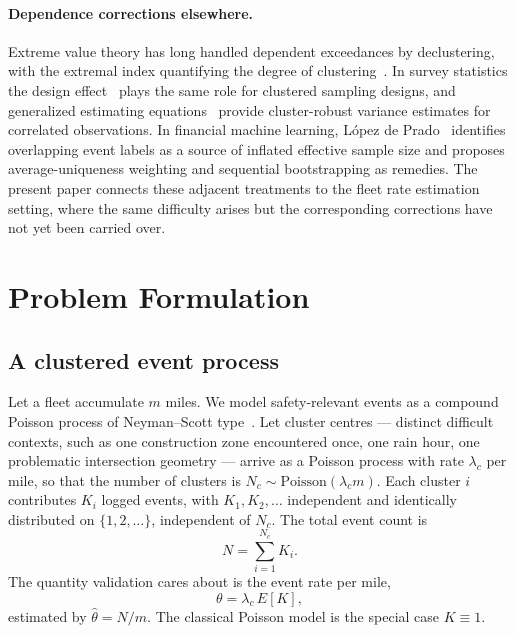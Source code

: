 \documentclass[11pt]{article}
\begin{document}
\paragraph{Dependence corrections elsewhere.} Extreme value theory has long handled
dependent exceedances by declustering, with the extremal index quantifying the
degree of clustering~\cite{ferro2003inference}. In survey statistics the design
effect~\cite{kish1965survey,cochran1977sampling} plays the same role for clustered
sampling designs, and generalized estimating
equations~\cite{liang1986longitudinal} provide cluster-robust variance estimates
for correlated observations. In financial machine learning, López de
Prado~\cite{lopezdeprado2018advances} identifies overlapping event labels as a
source of inflated effective sample size and proposes average-uniqueness weighting
and sequential bootstrapping as remedies. The present paper connects these adjacent
treatments to the fleet rate estimation setting, where the same difficulty arises
but the corresponding corrections have not yet been carried over.

\section{Problem Formulation}
\label{sec:formulation}

\subsection{A clustered event process}

Let a fleet accumulate $m$ miles. We model safety-relevant events as a compound
Poisson process of Neyman--Scott type~\cite{neyman1958statistical}. Let cluster
centres --- distinct difficult contexts, such as one construction zone encountered
once, one rain hour, one problematic intersection geometry --- arrive as a Poisson
process with rate $\lambda_c$ per mile, so that the number of clusters is
$N_c \sim \mathrm{Poisson}(\lambda_c m)$. Each cluster $i$ contributes $K_i$
logged events, with $K_1, K_2, \dots$ independent and identically distributed on
$\{1, 2, \dots\}$, independent of $N_c$. The total event count is
\begin{equation}
N = \sum_{i=1}^{N_c} K_i .
\end{equation}
The quantity validation cares about is the event rate per mile,
\begin{equation}
\theta = \lambda_c \, E[K],
\end{equation}
estimated by $\hat{\theta} = N/m$. The classical Poisson model is the special case
$K \equiv 1$.
\end{document}
